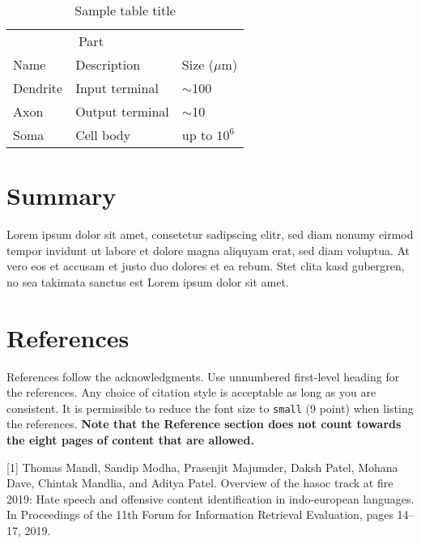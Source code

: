 \documentclass{article}
\begin{document}
\begin{table}
  \caption{Sample table title}
  \label{sample-table}
  \centering
  \begin{tabular}{lll}
    \toprule
    \multicolumn{2}{c}{Part}                   \\
    \cmidrule(r){1-2}
    Name     & Description     & Size ($\mu$m) \\
    \midrule
    Dendrite & Input terminal  & $\sim$100     \\
    Axon     & Output terminal & $\sim$10      \\
    Soma     & Cell body       & up to $10^6$  \\
    \bottomrule
  \end{tabular}
\end{table}

\section{Summary}

Lorem ipsum dolor sit amet, consetetur sadipscing elitr, sed diam nonumy eirmod tempor invidunt ut labore et dolore magna aliquyam erat, sed diam voluptua. At vero eos et accusam et justo duo dolores et ea rebum. Stet clita kasd gubergren, no sea takimata sanctus est Lorem ipsum dolor sit amet.

\section*{References}

References follow the acknowledgments. Use unnumbered first-level heading for
the references. Any choice of citation style is acceptable as long as you are
consistent. It is permissible to reduce the font size to \verb+small+ (9 point)
when listing the references.
{\bf Note that the Reference section does not count towards the eight pages of content that are allowed.}
\medskip

\small

[1] Thomas Mandl, Sandip Modha, Prasenjit Majumder, Daksh Patel, Mohana Dave, Chintak Mandlia, and Aditya Patel. Overview of the hasoc track at fire 2019: Hate speech and offensive content identification in indo-european languages. In Proceedings of the 11th Forum for Information Retrieval Evaluation, pages 14–17, 2019.
\end{document}
